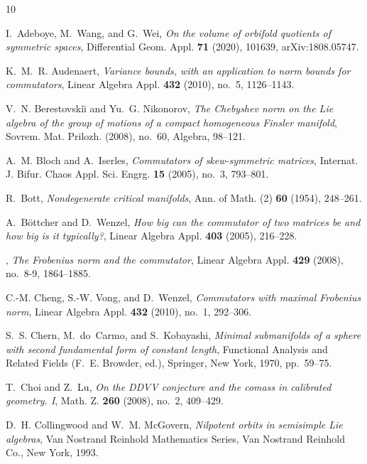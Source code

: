 \documentclass[leqno,10pt]{amsart}
\theoremstyle{definition}
\numberwithin{equation}{section}
\begin{document}
\begin{thebibliography}{10}

I.~Adeboye, M.~Wang, and G.~Wei, \emph{On the volume of orbifold quotients of
  symmetric spaces}, Differential Geom. Appl. \textbf{71} (2020), 101639,
  arXiv:1808.05747.

K.~M.~R. Audenaert, \emph{Variance bounds, with an application to norm bounds
  for commutators}, Linear Algebra Appl. \textbf{432} (2010), no.~5,
  1126--1143.

V.~N. Berestovski{\u\i} and Yu.~G. Nikonorov, \emph{The {C}hebyshev norm on the
  {L}ie algebra of the group of motions of a compact homogeneous {F}insler
  manifold}, Sovrem. Mat. Prilozh. (2008), no.~60, Algebra, 98--121.

A.~M. Bloch and A.~Iserles, \emph{Commutators of skew-symmetric matrices},
  Internat. J. Bifur. Chaos Appl. Sci. Engrg. \textbf{15} (2005), no.~3,
  793--801.

R.~Bott, \emph{Nondegenerate critical manifolds}, Ann. of Math. (2) \textbf{60}
  (1954), 248--261.

A.~B{\"o}ttcher and D.~Wenzel, \emph{How big can the commutator of two matrices
  be and how big is it typically?}, Linear Algebra Appl. \textbf{403} (2005),
  216--228.

\bysame, \emph{The {F}robenius norm and the commutator}, Linear Algebra Appl.
  \textbf{429} (2008), no.~8-9, 1864--1885.

C.-M. Cheng, S.-W. Vong, and D.~Wenzel, \emph{Commutators with maximal
  {F}robenius norm}, Linear Algebra Appl. \textbf{432} (2010), no.~1, 292--306.

S.~S. Chern, M.~do~Carmo, and S.~Kobayashi, \emph{Minimal submanifolds of a
  sphere with second fundamental form of constant length}, Functional
  {A}nalysis and {R}elated {F}ields (F.~E. Browder, ed.), Springer, New York,
  1970, pp.~59--75.

T.~Choi and Z.~Lu, \emph{On the {DDVV} conjecture and the comass in calibrated
  geometry. {I}}, Math. Z. \textbf{260} (2008), no.~2, 409--429.

D.~H. Collingwood and W.~M. McGovern, \emph{Nilpotent orbits in semisimple
  {L}ie algebras}, Van Nostrand Reinhold Mathematics Series, Van Nostrand
  Reinhold Co., New York, 1993.


\end{thebibliography}
\end{document}
